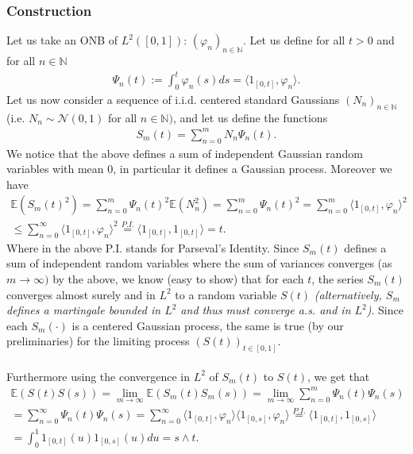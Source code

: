 \documentclass[../mainfile.tex]{subfiles}
\begin{document}
\subsubsection{Construction}
Let us take an ONB of $L^2 ([0,1])$: $(\varphi_n)_{n \in \mathbb{N}}$. Let us define for all $t>0$ and for all $n \in \mathbb{N}$ \begin{align*}
\Psi_n(t):= \int_0^t \varphi_n(s)ds = \langle 1_{[0,t]}, \varphi_n \rangle.
\end{align*}
Let us now consider a sequence of i.i.d. centered standard Gaussians $(N_n)_{n \in \mathbb{N}}$ (i.e. $N_n \sim \mathcal{N}(0,1)$ for all $n \in \mathbb{N})$, and let us define the functions
\begin{align*}
S_m(t) = \sum_{n =0}^m N_n \Psi_n(t).
\end{align*}
We notice that the above defines a sum of independent Gaussian random variables with mean $0$, in particular it defines a Gaussian process. Moreover we have 
\begin{align*}
\mathbb{E}(S_m(t)^2)= \sum_{n=0}^m \Psi_n(t)^2 \mathbb{E}(N_n^2) = \sum_{n=0}^m \Psi_n(t)^2  = \sum_{n=0}^m \langle 1_{[0,t]}, \varphi_n\rangle^2 
\\
\leq \sum_{n=0}^\infty \langle 1_{[0,t]}, \varphi_n \rangle^2 \overset{P.I.}=  \langle 1_{[0,t]},1_{[0,t]} \rangle = t. 
\end{align*}
Where in the above P.I. stands for Parseval's Identity. Since $S_m(t)$ defines a sum of independent random variables where the sum of variances converges (as $m \to \infty)$ by the above, we know (easy to show) that for each $t$, the series $S_m(t)$ converges almost surely and in $L^2$ to a random variable $S(t)$ \textit{(alternatively, $S_m$ defines a martingale bounded in $L^2$ and thus must converge a.s. and in $L^2$)}. Since each $S_m( \cdot)$ is a centered Gaussian process, the same is true (by our preliminaries) for the limiting process $(S(t))_{t \in [0,1]}$. \\
\\
Furthermore using the convergence in $L^2$ of $S_m(t)$ to $S(t)$, we get that 
\begin{align*}
\mathbb{E}(S(t)S(s))= \lim_{m \to \infty} \mathbb{E}(S_m(t)S_m(s)) = \lim_{m \to \infty} \sum_{n=0}^m \Psi_n(t)\Psi_n(s)\\  = \sum_{n=0}^\infty \Psi_n(t) \Psi_n(s) = \sum_{n=0}^\infty \langle 1_{[0,t]}, \varphi_n \rangle \langle 1_{[0,s]} , \varphi_n \rangle  \overset{P.I.}= \langle 1_{[0,t]}, 1_{[0,s]} \rangle \\
= \int_0^1 1_{[0,t]}(u) 1_{[0,s]}(u)du = s \wedge t.
\end{align*}
\end{document}
